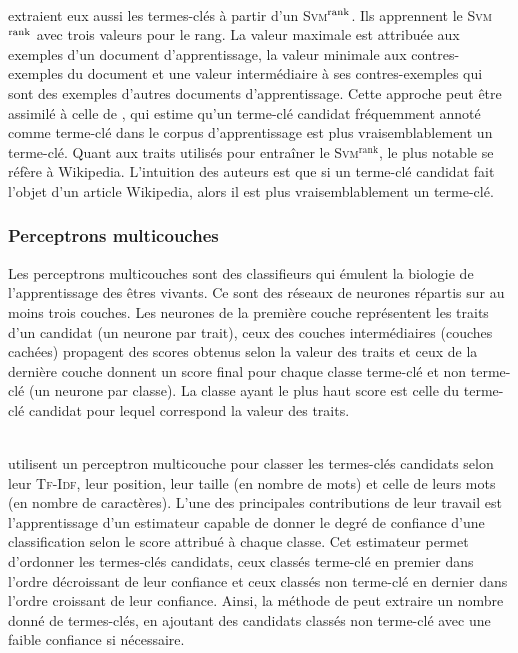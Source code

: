         ~\\ extraient eux aussi les termes-clés à
        partir d'un \textsc{Svm}$^\textnormal{rank}$. Ils apprennent le
        \textsc{Svm}$^\textnormal{rank}$ avec trois valeurs pour le rang. La
        valeur maximale est attribuée aux exemples d'un document
        d'apprentissage, la valeur minimale aux contres-exemples du document et
        une valeur intermédiaire à ses contres-exemples qui sont des exemples
        d'autres documents d'apprentissage. Cette approche peut être assimilé à
        celle de , qui estime qu'un terme-clé
        candidat fréquemment annoté comme terme-clé dans le corpus
        d'apprentissage est plus vraisemblablement un terme-clé. Quant aux
        traits utilisés pour entraîner le \textsc{Svm}$^\text{rank}$, le plus
        notable se réfère à Wikipedia. L'intuition des auteurs est que si un
        terme-clé candidat fait l'objet d'un article Wikipedia, alors il est
        plus vraisemblablement un terme-clé.

      \subsubsection{Perceptrons multicouches}
      \label{subsubsec:main-state_of_the_art-automatic_keyphrase_extraction-supervised_keyphrase_extraction-neural_network}
        Les perceptrons multicouches sont des classifieurs qui émulent la
        biologie de l'apprentissage des êtres vivants. Ce sont des réseaux de
        neurones répartis sur au moins trois couches. Les neurones de la
        première couche représentent les traits d'un candidat (un neurone par
        trait), ceux des couches intermédiaires (couches cachées) propagent des
        scores obtenus selon la valeur des traits et ceux de la dernière couche
        donnent un score final pour chaque classe \og{}terme-clé\fg{} et
        \og{}non terme-clé\fg{} (un neurone par classe). La classe ayant le plus
        haut score est celle du terme-clé candidat pour lequel correspond la
        valeur des traits.
        
        ~\\ utilisent un perceptron multicouche
        pour classer les termes-clés candidats selon leur \textsc{Tf-Idf}, leur
        position, leur taille (en nombre de mots) et celle de leurs mots (en
        nombre de caractères). L'une des principales contributions de leur
        travail est l'apprentissage d'un estimateur capable de donner le degré
        de confiance d'une classification selon le score attribué à chaque
        classe. Cet estimateur permet d'ordonner les termes-clés candidats,
        ceux classés \og{}terme-clé\fg{} en premier dans l'ordre décroissant de
        leur confiance et ceux classés \og{}non terme-clé\fg{} en dernier dans
        l'ordre croissant de leur confiance. Ainsi, la méthode de
         peut extraire un nombre donné de
        termes-clés, en ajoutant des candidats classés \og{}non terme-clé\fg{}
        avec une faible confiance si nécessaire.

